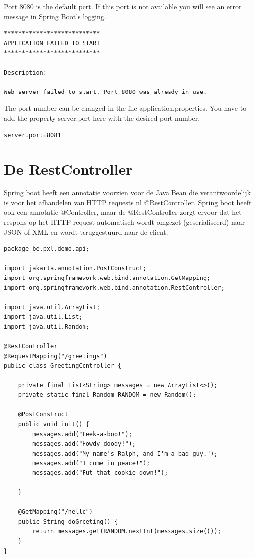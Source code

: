 Port 8080 is the default port. If this port is not available you will see an error message in Spring Boot's logging.

\begin{lstlisting}[frame=single]
***************************
APPLICATION FAILED TO START
***************************

Description:

Web server failed to start. Port 8080 was already in use.
\end{lstlisting}

The port number can be changed in the file application.properties. You have to add the property server.port here with the desired port number.

\begin{lstlisting}[frame=single]
server.port=8081
\end{lstlisting}

\section{De RestController}

Spring boot heeft een annotatie voorzien voor de Java Bean die verantwoordelijk is voor het afhandelen van HTTP requests nl @RestController. Spring boot heeft ook een annotatie @Controller, maar de @RestController zorgt ervoor dat het respons op het HTTP-request automatisch wordt omgezet (geserialiseerd) naar JSON of XML en wordt teruggestuurd naar de client.


\begin{lstlisting}[frame=single]
package be.pxl.demo.api;

import jakarta.annotation.PostConstruct;
import org.springframework.web.bind.annotation.GetMapping;
import org.springframework.web.bind.annotation.RestController;

import java.util.ArrayList;
import java.util.List;
import java.util.Random;

@RestController
@RequestMapping("/greetings")
public class GreetingController {

    private final List<String> messages = new ArrayList<>();
    private static final Random RANDOM = new Random();

    @PostConstruct
    public void init() {
        messages.add("Peek-a-boo!");
        messages.add("Howdy-doody!");
        messages.add("My name's Ralph, and I'm a bad guy.");
        messages.add("I come in peace!");
        messages.add("Put that cookie down!");

    }

    @GetMapping("/hello")
    public String doGreeting() {
        return messages.get(RANDOM.nextInt(messages.size()));
    }
}
\end{lstlisting}

